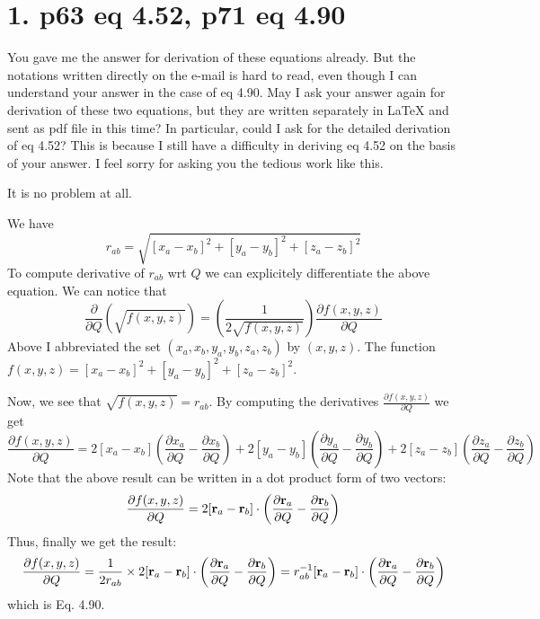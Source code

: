 \documentclass{exam}
\newcommand{\fderiv}[2]{\ensuremath{
\frac{\partial #1}{\partial #2}}}
\begin{document}
\section{1. p63 eq 4.52, p71 eq 4.90}

\begin{questions}
\question You gave me the answer for derivation of these equations already.
But the notations written directly on the e-mail is hard to read, even though I can understand your answer in the case of eq 4.90.
May I ask your answer again for derivation of these two equations, 
but they are written separately in LaTeX and sent as pdf file in this time?
In particular, could I ask for the detailed derivation of eq 4.52? 
This is because I still have a difficulty in deriving eq 4.52 on the basis of your answer. 
I feel sorry for asking you the tedious work like this.

\begin{solution}
It is no problem at all. 

We have
%
\begin{equation}
r_{ab} = \sqrt{ [x_a-x_b]^2 + [y_a-y_b]^2 + [z_a-z_b]^2 }
\end{equation}
%
To compute derivative of $r_{ab}$ wrt $Q$ we can
explicitely differentiate the above equation. We can notice that
%
\begin{equation}
\frac{\partial}{\partial Q} \left( \sqrt {f(x,y,z)} \right) = \left( \frac{1}{2 \sqrt{f(x,y,z)}} \right)  \fderiv{f(x,y,z)}{Q}
\end{equation}
%
Above I abbreviated the set $(x_a, x_b, y_a, y_b, z_a, z_b)$ by $(x,y,z)$.
The function $f(x,y,z) = [x_a-x_b]^2 + [y_a-y_b]^2 + [z_a-z_b]^2$.

Now, we see that $\sqrt{f(x,y,z)} = r_{ab}$. By computing the derivatives $\fderiv{f(x,y,z)}{Q}$ we get
%
\begin{equation}
\fderiv{f(x,y,z)}{Q} = 2[x_a-x_b]  \left(\fderiv{x_a}{Q} - \fderiv{x_b}{Q}\right)
                     + 2[y_a-y_b]  \left(\fderiv{y_a}{Q} - \fderiv{y_b}{Q}\right) 
                     + 2[z_a-z_b]  \left(\fderiv{z_a}{Q} - \fderiv{z_b}{Q}\right)
\end{equation}
%
Note that the above result can be written in a dot product form of two vectors:
%
\begin{equation}
\fderiv{f(x,y,z)}{Q} = 2 [ {\bf r}_a - {\bf r}_b ] \cdot \left(\fderiv{{\bf r}_a}{Q} - \fderiv{{\bf r}_b}{Q}\right)
\end{equation}
%
Thus, finally we get the result:
%
\begin{equation}
\fderiv{f(x,y,z)}{Q} = \frac{1}{2r_{ab}} 
   \times 2 [ {\bf r}_a - {\bf r}_b ] \cdot \left(\fderiv{{\bf r}_a}{Q} - \fderiv{{\bf r}_b}{Q}\right)
 = r_{ab}^{-1} [ {\bf r}_a - {\bf r}_b ] \cdot \left(\fderiv{{\bf r}_a}{Q} - \fderiv{{\bf r}_b}{Q}\right)
\end{equation}
which is Eq. 4.90.


\end{solution}
\end{questions}
\end{document}
